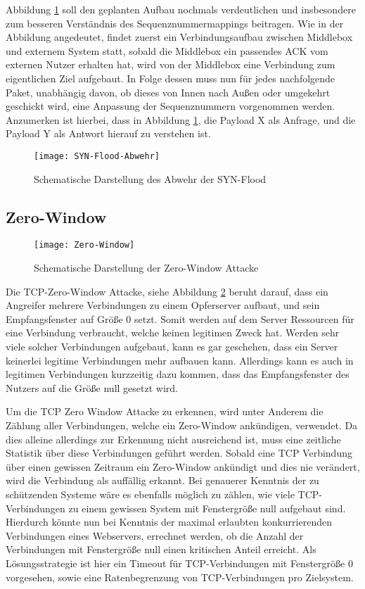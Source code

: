 \documentclass[../review_1.tex]{subfiles}
\begin{document}
Abbildung \ref{fig:SYN-Flood-Abwehr} soll den geplanten Aufbau nochmals verdeutlichen und insbesondere zum besseren Verständnis des Sequenznummermappings beitragen. Wie in der Abbildung angedeutet, findet zuerst ein Verbindungsaufbau zwischen Middlebox und externem System statt, sobald die Middlebox ein passendes ACK vom externen Nutzer erhalten hat, wird von der Middlebox eine Verbindung zum eigentlichen Ziel aufgebaut. In Folge dessen muss nun für jedes nachfolgende Paket, unabhängig davon, ob dieses von Innen nach Außen oder umgekehrt geschickt wird, eine Anpassung der Sequenznummern vorgenommen werden. Anzumerken ist hierbei, dass in Abbildung \ref{fig:SYN-Flood-Abwehr}, die Payload X als Anfrage, und die Payload Y als Antwort hierauf zu verstehen ist.
\begin{figure}[t]
    \centering
    \texttt{[image: SYN-Flood-Abwehr]}
    \caption{Schematische Darstellung des Abwehr der SYN-Flood}
    \label{fig:SYN-Flood-Abwehr}
\end{figure}


\subsection{Zero-Window}
\begin{figure}[t]
    \centering
    \texttt{[image: Zero-Window]}
    \caption{Schematische Darstellung der Zero-Window Attacke}
    \label{fig:Zero-Window}
\end{figure}
Die TCP-Zero-Window Attacke, siehe Abbildung \ref{fig:Zero-Window} beruht darauf, dass ein Angreifer mehrere Verbindungen zu einem Opferserver aufbaut, und sein Empfangsfenster auf Größe 0 setzt. Somit werden auf dem Server Ressourcen für eine Verbindung verbraucht, welche keinen legitimen Zweck hat.
Werden sehr viele solcher Verbindungen aufgebaut, kann es gar geschehen, dass ein Server keinerlei legitime Verbindungen mehr aufbauen kann. Allerdings kann es auch in legitimen Verbindungen kurzzeitig dazu kommen, dass das Empfangsfenster des Nutzers auf die Größe null gesetzt wird.

Um die TCP Zero Window Attacke zu erkennen, wird unter Anderem die Zählung aller Verbindungen, welche ein Zero-Window ankündigen, verwendet. Da dies alleine allerdings zur Erkennung nicht ausreichend ist, muss eine zeitliche Statistik über diese Verbindungen geführt werden. Sobald eine TCP Verbindung über einen gewissen Zeitraum ein Zero-Window ankündigt und dies nie verändert, wird die Verbindung als auffällig erkannt. Bei genauerer Kenntnis der zu schützenden Systeme wäre es ebenfalls möglich zu zählen, wie viele TCP-Verbindungen zu einem gewissen System mit Fenstergröße null aufgebaut sind. Hierdurch könnte nun bei Kenntnis der maximal erlaubten konkurrierenden Verbindungen eines Webservers, errechnet werden, ob die Anzahl der Verbindungen mit Fenstergröße null einen kritischen Anteil erreicht. Als Lösungsstrategie ist hier ein Timeout für TCP-Verbindungen mit Fenstergröße 0 vorgesehen, sowie eine Ratenbegrenzung von TCP-Verbindungen pro Zielsystem.
\end{document}
